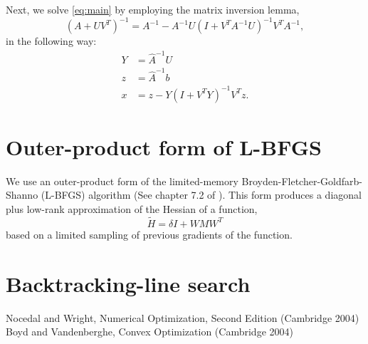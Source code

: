 \documentclass{article}
\begin{document}
Next, we solve \ref{eq:main} by employing the matrix inversion lemma,
    \begin{equation}
    (A+UV^T)^{-1} = A^{-1} - A^{-1}U(I + V^T A^{-1}U)^{-1} V^T A^{-1},
    \end{equation}
    in the following way:
\begin{align}
    Y &= \hat{A}^{-1} U \\
    z &= \hat{A}^{-1} b \\
    x &= z - Y (I + V^T Y)^{-1} V^T z.
\end{align}

\section{Outer-product form of L-BFGS}
We use an outer-product form of the 
    limited-memory Broyden-Fletcher-Goldfarb-Shanno (L-BFGS) algorithm
    (See chapter 7.2 of \cite{NW04}).
This form produces a diagonal plus low-rank approximation
    of the Hessian of a function,
    \begin{equation}
    \tilde{H} = \delta I + W M W^T
    \end{equation}
    based on a limited sampling of previous gradients of the function.


\section{Backtracking-line search}

\begin{thebibliography}{99}
 Nocedal and Wright, 
    Numerical Optimization, Second Edition (Cambridge 2004)
 Boyd and Vandenberghe,
    Convex Optimization (Cambridge 2004)
\end{thebibliography}
\end{document}
